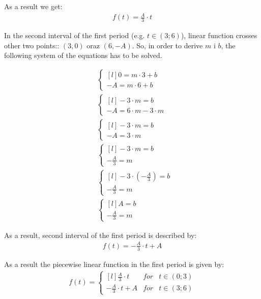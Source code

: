 \begin{task}
As a result we get:
\begin{align*}
f(t) = \frac{A}{3}\cdot t
\end{align*}

In the second interval of the first period (e.g. $t \in (3; 6)$), linear function crosses other two points:: $(3,0)$ oraz $(6,-A)$. So, in order to derive $m$ i $b$, the following system of the equations has to be solved.

\begin{align*}
&\left\{\begin{matrix*}[l]
0 = m\cdot 3 +b\\ 
-A = m\cdot 6 +b
\end{matrix*}\right. \\
&\left\{\begin{matrix*}[l]
-3 \cdot m = b\\ 
-A = 6 \cdot m -3 \cdot m
\end{matrix*}\right. \\
&\left\{\begin{matrix*}[l]
-3 \cdot m = b\\ 
-A = 3 \cdot m
\end{matrix*}\right. \\
&\left\{\begin{matrix*}[l]
-3 \cdot m = b\\  
-\frac{A}{3} = m
\end{matrix*}\right. \\
&\left\{\begin{matrix*}[l]
-3 \cdot (-\frac{A}{3}) = b\\
-\frac{A}{3} = m
\end{matrix*}\right. \\
&\left\{\begin{matrix*}[l]
A = b\\
-\frac{A}{3} = m
\end{matrix*}\right.
\end{align*}

As a result, second interval of the first period is described by:
\begin{align*}
f(t) = -\frac{A}{3}\cdot t + A
\end{align*}


As a result the piecewise linear function in the first period is given by:
\begin{align*}
f(t) = \left\{\begin{matrix*}[l]
\frac{A}{3}\cdot t & for &t \in (0;3)\\ 
-\frac{A}{3}\cdot t + A & for & t \in (3; 6)
\end{matrix*}\right.
\end{align*}


\end{task}
